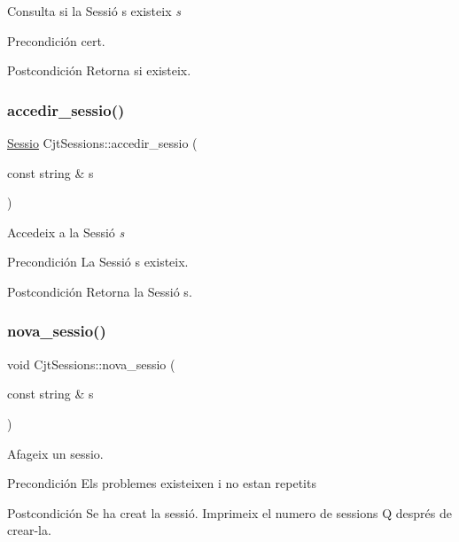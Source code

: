 Consulta si la Sessió s existeix {\itshape s} 

\begin{DoxyPrecond}{Precondición}
cert. 
\end{DoxyPrecond}
\begin{DoxyPostcond}{Postcondición}
Retorna si existeix. 
\end{DoxyPostcond}
\mbox{\label{class_cjt_sessions_a1b537e16d53208300ed8a659440b85cd}} 
\subsubsection{\texorpdfstring{accedir\+\_\+sessio()}{accedir\_sessio()}}
{\footnotesize\ttfamily \mbox{\hyperlink{class_sessio}{Sessio}} Cjt\+Sessions\+::accedir\+\_\+sessio (\begin{DoxyParamCaption}\item[{const string \&}]{s }\end{DoxyParamCaption})}



Accedeix a la Sessió {\itshape s} 

\begin{DoxyPrecond}{Precondición}
La Sessió s existeix. 
\end{DoxyPrecond}
\begin{DoxyPostcond}{Postcondición}
Retorna la Sessió s. 
\end{DoxyPostcond}
\mbox{\label{class_cjt_sessions_ac6e00a3727d5ece89965a4f38d707273}} 
\subsubsection{\texorpdfstring{nova\+\_\+sessio()}{nova\_sessio()}}
{\footnotesize\ttfamily void Cjt\+Sessions\+::nova\+\_\+sessio (\begin{DoxyParamCaption}\item[{const string \&}]{s }\end{DoxyParamCaption})}



Afageix un sessio. 

\begin{DoxyPrecond}{Precondición}
Els problemes existeixen i no estan repetits 
\end{DoxyPrecond}
\begin{DoxyPostcond}{Postcondición}
Se ha creat la sessió. Imprimeix el numero de sessions Q després de crear-\/la. 
\end{DoxyPostcond}
\mbox{\label{class_cjt_sessions_a4ea0fafab13c9db8fe385f62fb572fc0}} 
